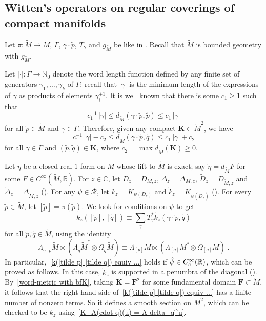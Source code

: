 \documentclass{memo-l}
\theoremstyle{plain}
\theoremstyle{definition}
\theoremstyle{remark}
\newcommand{\C}{\mathbb{C}}
\newcommand{\N}{\mathbb{N}}
\newcommand{\R}{\mathbb{R}}
\newcommand{\RR}{\mathcal{R}}
\newcommand{\bfF}{\boldsymbol{F}}
\newcommand{\bfK}{\boldsymbol{K}}
\newcommand{\Cinftyc}{C^\infty_{\text{\rm c}}}
\numberwithin{section}{chapter}
\numberwithin{equation}{section}%
\begin{document}
\subsection{Witten's operators on regular coverings of compact manifolds}
\label{ss: perturbed Schwartz kernels on regular coverings of compact mfds}

Let $\pi:\widetilde M\to M$, $\Gamma$, $\gamma\cdot\tilde p$, $T_\gamma$ and $g_{\widetilde M}$ be like in . Recall that $\widetilde M$ is bounded geometry with $g_{\widetilde M}$. 

Let $|{\cdot}|:\Gamma\to\N_0$ denote the word length function defined by any finite set of generators $\gamma_1,\dots,\gamma_k$ of $\Gamma$; recall that $|\gamma|$ is the minimum length of the expressions of $\gamma$ as products of elements $\gamma_i^{\pm1}$. It is well known that there is some $c_1\ge1$ such that
\begin{equation}\label{word-metric}
c_1^{-1}\,|\gamma|\le d_{\widetilde M}(\gamma\cdot \tilde p,\tilde p)\le c_1\,|\gamma|
\end{equation}
for all $\tilde p\in\widetilde M$ and $\gamma\in\Gamma$. Therefore, given any compact $\bfK\subset\widetilde M^2$, we have
\begin{equation}\label{word-metric with bfK}
c_1^{-1}\,|\gamma|-c_2 \le d_{\widetilde M}(\gamma\cdot \tilde p,\tilde q) \le c_1\,|\gamma|+c_2
\end{equation}
for all $\gamma\in\Gamma$ and $(\tilde p,\tilde q)\in\bfK$, where $c_2=\max d_{\widetilde M}(\bfK)\ge0$. 

Let $\eta$ be a closed real $1$-form on $M$ whose lift to $\widetilde M$ is exact; say $\tilde\eta=d_{\widetilde M}F$ for some $F\in C^\infty(\widetilde M,\R)$. For $z\in\C$, let $D_z=D_{M,z}$, $\Delta_z=\Delta_{M,z}$, $\widetilde D_z=D_{\widetilde M,z}$ and $\widetilde\Delta_z=\Delta_{\widetilde M,z}$ (). For any $\psi\in\RR$, let $k_z=K_{\psi(D_z)}$ and $\tilde k_z=K_{\psi(\widetilde D_z)}$ (). For every $\tilde p\in\widetilde M$, let $[\tilde p]=\pi(\tilde p)$. We look for conditions on $\psi$ to get
\begin{equation}\label{k([tilde p] [tilde q]) equiv ...}
k_z([\tilde p],[\tilde q])\equiv\sum_\gamma T_\gamma^*\tilde k_z(\gamma\cdot\tilde p,\tilde q)
\end{equation}
for all $\tilde p,\tilde q\in\widetilde M$, using the identity
\[
\Lambda_{\gamma\cdot\tilde p}\widetilde M\boxtimes(\Lambda_{\tilde q}\widetilde M^*\otimes\Omega_{\tilde q}\widetilde M)
\equiv\Lambda_{[p]} M\boxtimes(\Lambda_{[q]} M^*\otimes\Omega_{[q]} M)\;.
\]
In particular,~\eqref{k([tilde p] [tilde q]) equiv ...} holds if $\hat\psi\in\Cinftyc(\R)$, which can be proved as follows. In this case, $\tilde k_z$ is supported in a penumbra of the diagonal (). By~\eqref{word-metric with bfK}, taking $\bfK=\bfF^2$ for some fundamental domain $\bfF\subset\widetilde M$, it follows that the right-hand side of~\eqref{k([tilde p] [tilde q]) equiv ...} has a finite number of nonzero terms. So it defines a smooth section on $M^2$, which can be checked to be $k_z$ using~\eqref{K_A(cdot q)(u) = A delta_q^u}. 
\end{document}
